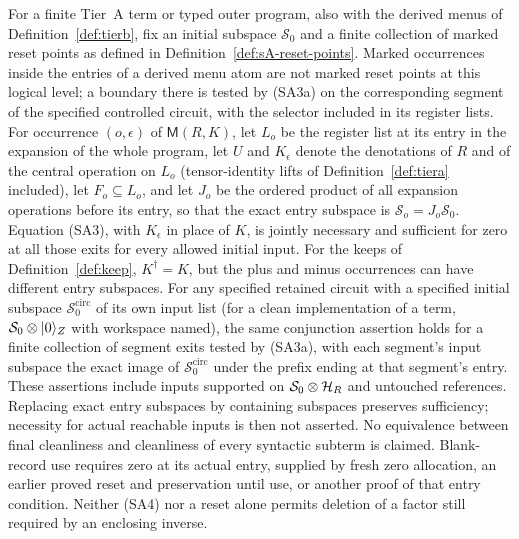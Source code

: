 \begin{theorem}
For a finite Tier~A term or typed outer program, also with the derived
menus of Definition~\ref{def:tierb}, fix an initial subspace
$\mathcal S_0$ and a finite collection of marked reset points as
defined in Definition~\ref{def:sA-reset-points}. Marked occurrences inside the entries of a derived menu atom are not
marked reset points at this logical level; a boundary there is tested by
(SA3a) on the corresponding segment of the specified controlled circuit,
with the selector included in its register lists. For occurrence $(o,\epsilon)$ of $\mathsf M(R,K)$, let $L_o$ be the
register list at its entry in the expansion of the whole program, let
$U$ and $K_\epsilon$ denote the denotations of $R$ and of the central
operation on $L_o$ (tensor-identity lifts of
Definition~\ref{def:tiera} included), let $F_o\subseteq L_o$, and let
$J_o$ be the ordered product of all expansion operations before its
entry, so that the exact entry subspace is
$\mathcal S_o=J_o\mathcal S_0$. Equation (SA3), with $K_\epsilon$ in
place of $K$, is jointly necessary and sufficient for zero at all
those exits for every allowed initial input. For the keeps of
Definition~\ref{def:keep}, $K^\dagger=K$, but the plus and minus
occurrences can have different entry subspaces. For any specified retained circuit with a specified initial subspace
$\mathcal S_0^{\mathrm{circ}}$ of its own input list (for a clean
implementation of a term, $\mathcal S_0\otimes\lvert 0\rangle_Z$ with workspace
named), the same conjunction assertion holds for a finite collection of
segment exits tested by (SA3a), with each segment's input subspace the
exact image of $\mathcal S_0^{\mathrm{circ}}$ under the prefix ending at
that segment's entry. These assertions include inputs supported on
$\mathcal S_0\otimes\mathcal{H}_R$ and untouched references.
Replacing exact entry subspaces by containing subspaces preserves
sufficiency; necessity for actual reachable inputs is then not asserted.
No equivalence between final cleanliness and cleanliness of every
syntactic subterm is claimed. Blank-record use requires
zero at its actual entry, supplied by fresh zero allocation, an earlier
proved reset and preservation until use, or another proof of that entry
condition. Neither (SA4) nor a reset alone permits deletion of a factor
still required by an enclosing inverse.
\end{theorem}
